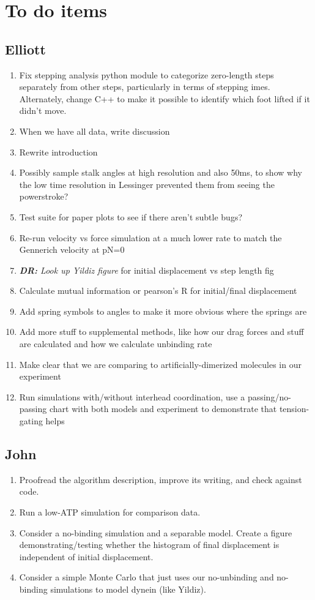 \documentclass[9pt,twocolumn,twoside]{pnas-new}
\newcommand\davidsays[1]{{\em\color{blue} {\bf DR:} #1}}
\begin{document}
\showmatmethods

\section{To do items}

\subsection{Elliott}
\begin{enumerate}
\item Fix stepping analysis python module to categorize zero-length steps separately from other steps, particularly in terms of stepping imes.  Alternately, change C++ to make it possible to identify which foot lifted if it didn't move.
\item When we have all data, write discussion
\item Rewrite introduction
\item Possibly sample stalk angles at high resolution and also 50ms, to show why the low time resolution in Lessinger prevented them from seeing the powerstroke?
\item Test suite for paper plots to see if there aren't subtle bugs?
\item Re-run velocity vs force simulation at a much lower rate to match the Gennerich velocity at pN=0
\item \davidsays{Look up Yildiz figure} for initial displacement vs step length fig
\item Calculate mutual information or pearson's R for initial/final displacement
\item Add spring symbols to angles to make it more obvious where the springs are
\item Add more stuff to supplemental methods, like how our drag forces and stuff are calculated and how we calculate unbinding rate
\item Make clear that we are comparing to artificially-dimerized molecules in our experiment
\item Run simulations with/without interhead coordination, use a passing/no-passing chart with both models and experiment to demonstrate that tension-gating helps
\end{enumerate}

\subsection{John}
\begin{enumerate}
\item Proofread the algorithm description, improve its writing, and
  check against code.
\item Run a low-ATP simulation for comparison data.
\item Consider a no-binding simulation and a separable model.  Create
  a figure demonstrating/testing whether the histogram of final
  displacement is independent of initial displacement.
\item Consider a simple Monte Carlo that just uses our no-unbinding
  and no-binding simulations to model dynein (like Yildiz).
\end{enumerate}
\end{document}
